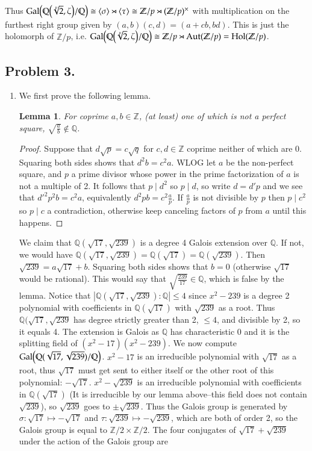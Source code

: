\documentclass[12pt]{article}
\newtheorem{lemma}{Lemma}
\theoremstyle{definitionstyle}
\def\mbb#1{\mathbb{#1}}
\def\bZ{\mbb{Z}}
\newcommand{\Z}{\mbb Z}
\newcommand{\gen}[1]{\left\langle #1 \right\rangle}
\newcommand{\Aut}{\mathrm{Aut}}
\newcommand{\Q}{\mbb Q}
\newcommand{\Gal}{\mathrm{Gal}\qty}
\begin{document}
		Thus $\Gal(\Q\qty(\sqrt[p]{2}, \zeta) / \Q) \cong \gen{\sigma} \rtimes \gen{\tau} \cong \Z/p \rtimes (\Z/p)^\times$ with multiplication on the furthest right group given by $(a,b)(c,d) = (a+cb, bd)$. This is just the holomorph of $\Z/p$, i.e. $\Gal(\Q\qty(\sqrt[p]{2}, \zeta) / \Q) \cong \Z/p \rtimes \Aut(\Z/p) = \mathrm{Hol}(\Z/p)$.
		
		\subsection*{Problem 3.}
		\begin{enumerate}[label=(\arabic*)]
			\item We first prove the following lemma.
			\begin{lemma}
				For coprime $a, b \in \Z$, (at least) one of which is not a perfect square, $\sqrt{\frac ab} \not \in \Q$.
			\end{lemma}
			\begin{proof}
				Suppose that $d\sqrt{p} = c\sqrt{q}$ for $c, d \in \bZ$ coprime neither of which are 0. Squaring both sides shows that $d^2b=c^2a$. WLOG let $a$ be the non-perfect square, and $p$ a prime divisor whose power in the prime factorization of $a$ is not a multiple of 2. It follows that $p \mid d^2$ so $p \mid d$, so write $d = d'p$ and we see that $d'^2p^2b = c^2a$, equivalently $d^2pb = c^2\frac ap$. If $\frac ap$ is not divisible by $p$ then $p \mid c^2$ so $p \mid c$ a contradiction, otherwise keep canceling factors of $p$ from $a$ until this happens.
			\end{proof}
			We claim that $\Q(\sqrt{17}, \sqrt{239})$ is a degree 4 Galois extension over $\Q$. If not, we would have $\Q(\sqrt{17}, \sqrt{239}) = \Q(\sqrt{17}) = \Q(\sqrt{239})$. Then $\sqrt{239} = a\sqrt{17} + b$. Squaring both sides shows that $b = 0$ (otherwise $\sqrt{17}$ would be rational). This would say that $\sqrt{\frac{239}{17}} \in \Q$, which is false by the lemma. Notice that $|\Q(\sqrt{17}, \sqrt{239}) : \Q| \leq 4$ since $x^2-239$ is a degree 2 polynomial with coefficients in $\Q(\sqrt{17})$ with $\sqrt{239}$ as a root. Thus $\Q(\sqrt{17}, \sqrt{239}$ has degree strictly greater than 2, $\leq 4$, and divisible by 2, so it equals 4. The extension is Galois as $\Q$ has characteristic 0 and it is the splitting field of $(x^2-17)(x^2-239)$. We now compute $\Gal(\Q(\sqrt{17}, \sqrt{239})/\Q)$. $x^2-17$ is an irreducible polynomial with $\sqrt{17}$ as a root, thus $\sqrt{17}$ must get sent to either itself or the other root of this polynomial: $-\sqrt{17}$. $x^2-\sqrt{239}$ is an irreducible polynomial with coefficients in $\Q(\sqrt{17})$ (It is irreducible by our lemma above--this field does not contain $\sqrt{239}$), so $\sqrt{239}$ goes to $\pm \sqrt{239}$. Thus the Galois group is generated by $\sigma: \sqrt{17} \mapsto -\sqrt{17}$ and $\tau: \sqrt{239} \mapsto -\sqrt{239}$, which are both of order 2, so the Galois group is equal to $\Z/2 \times \Z/2$. The four conjugates of $\sqrt{17}+\sqrt{239}$ under the action of the Galois group are

\end{enumerate}
\end{document}

